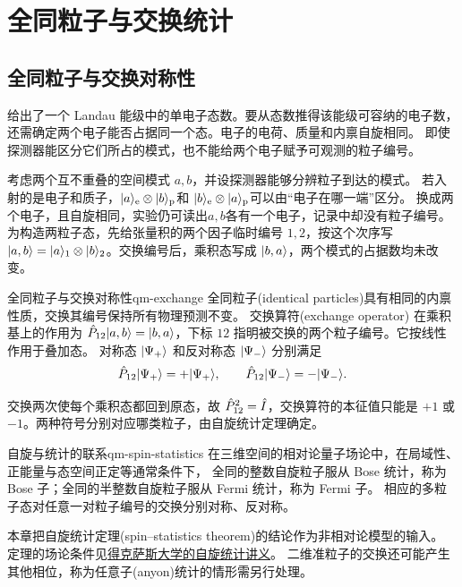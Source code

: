 \chapter{全同粒子与交换统计}
\label{ch:identical}

\section{全同粒子与交换对称性}
给出了一个 Landau 能级中的单电子态数。要从态数推得该能级可容纳的电子数，
还需确定两个电子能否占据同一个态。电子的电荷、质量和内禀自旋相同。
即使探测器能区分它们所占的模式，也不能给两个电子赋予可观测的粒子编号。

考虑两个互不重叠的空间模式 $a,b$，并设探测器能够分辨粒子到达的模式。
若入射的是电子和质子，$\lvert a\rangle_{\mathrm{e}} \otimes \lvert b\rangle_{\mathrm{p}}$和
$\lvert b\rangle_{\mathrm{e}} \otimes \lvert a\rangle_{\mathrm{p}}$可以由“电子在哪一端”区分。
换成两个电子，且自旋相同，实验仍可读出$a,b$各有一个电子，记录中却没有粒子编号。
为构造两粒子态，先给张量积的两个因子临时编号 $1,2$，按这个次序写
$\lvert a,b\rangle = \lvert a\rangle_1 \otimes \lvert b\rangle_2$。交换编号后，乘积态写成 $\lvert b,a\rangle$，两个模式的占据数均未改变。
\begin{definition}{全同粒子与交换对称性}{qm-exchange}
    全同粒子(identical particles)具有相同的内禀性质，交换其编号保持所有物理预测不变。
    交换算符(exchange operator) 在乘积基上的作用为 $\hat{P}_{12}\lvert a,b\rangle = \lvert b,a\rangle$，下标 $12$ 指明被交换的两个粒子编号。它按线性作用于叠加态。
    对称态 $\lvert\Psi_+\rangle$ 和反对称态 $\lvert\Psi_-\rangle$ 分别满足
    \begin{equation}
        \hat{P}_{12}\lvert\Psi_+\rangle = +\lvert\Psi_+\rangle,\qquad
        \hat{P}_{12}\lvert\Psi_-\rangle = -\lvert\Psi_-\rangle.
    \end{equation}
\end{definition}
交换两次使每个乘积态都回到原态，故 $\hat{P}_{12}^2 = \hat{I}$，交换算符的本征值只能是 $+1$ 或 $-1$。两种符号分别对应哪类粒子，由自旋统计定理确定。

\begin{theorem}{自旋与统计的联系}{qm-spin-statistics}
    在三维空间的相对论量子场论中，在局域性、正能量与态空间正定等通常条件下，
    全同的整数自旋粒子服从 Bose 统计，称为 Bose 子；全同的半整数自旋粒子服从 Fermi 统计，称为 Fermi 子。
    相应的多粒子态对任意一对粒子编号的交换分别对称、反对称。
\end{theorem}
本章把自旋统计定理(spin--statistics theorem)的结论作为非相对论模型的输入。
定理的场论条件见\href{https://web2.ph.utexas.edu/~vadim/Classes/2024f-qft/spinstat.pdf}{得克萨斯大学的自旋统计讲义}。
二维准粒子的交换还可能产生其他相位，称为任意子(anyon)统计的情形需另行处理。

